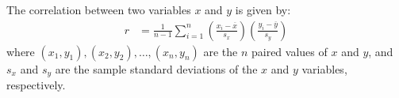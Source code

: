 \begin{termBox}{%
		The correlation between two variables $x$ and $y$ is given by:
		\begin{align}
		r &=  \frac{1}{n-1}\sum^{n}_{i=1}
		\left(\frac{x_{i}-\overline{x}}
		{s_{x}}\right)\left(\frac{y_{i}-\overline{y}}{s_{y}}\right)
		\label{correlationEquation}
		\end{align}
		where $(x_1,y_1), (x_2,y_2), \ldots, (x_n, y_n)$ are the $n$ paired values of $x$ and $y$, and $s_x$ and $s_y$ are the sample standard deviations of the $x$ and $y$
		variables, respectively.}
\end{termBox}



